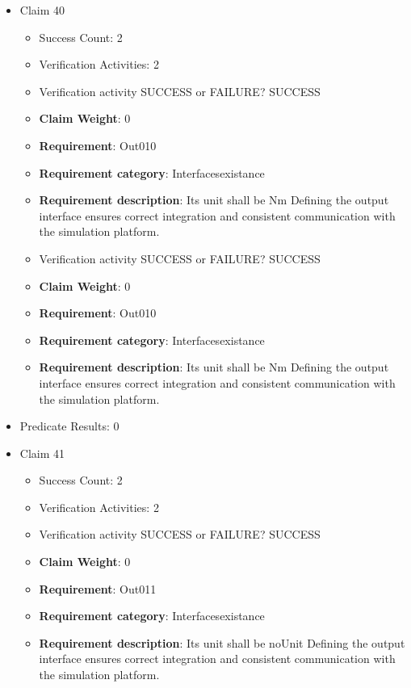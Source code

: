 \documentclass{article}
\begin{document}
\begin{itemize}
  				  \item Claim 40
				\begin{itemize}
			    	\item Success Count: 2 
			    	\item Verification Activities: 2
					\item Verification activity SUCCESS or FAILURE? SUCCESS
					\item \textbf{Claim Weight}: 0
						\item \textbf{Requirement}: Out010 
						\item \textbf{Requirement category}: Interfacesexistance 
						\item \textbf{Requirement description}: Its unit shall be Nm Defining the output interface ensures correct integration and consistent communication with the simulation platform.
					
					\item Verification activity SUCCESS or FAILURE? SUCCESS
					\item \textbf{Claim Weight}: 0
						\item \textbf{Requirement}: Out010 
						\item \textbf{Requirement category}: Interfacesexistance 
						\item \textbf{Requirement description}: Its unit shall be Nm Defining the output interface ensures correct integration and consistent communication with the simulation platform.
					
				\end{itemize}
				
									    
				\item Predicate Results: 0

  				  \item Claim 41
				\begin{itemize}
			    	\item Success Count: 2 
			    	\item Verification Activities: 2
					\item Verification activity SUCCESS or FAILURE? SUCCESS
					\item \textbf{Claim Weight}: 0
						\item \textbf{Requirement}: Out011 
						\item \textbf{Requirement category}: Interfacesexistance 
						\item \textbf{Requirement description}: Its unit shall be noUnit Defining the output interface ensures correct integration and consistent communication with the simulation platform.
					

\end{itemize}
\end{itemize}
\end{document}
